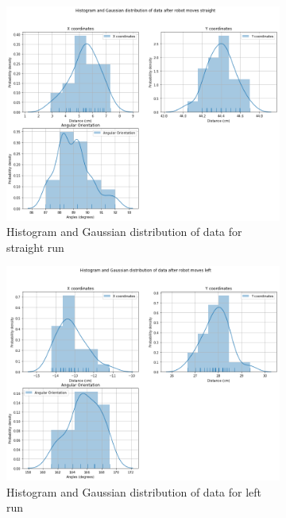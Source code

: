 \documentclass[10pt,a4paper]{article}
\begin{document}
				 \begin{figure}[H]
				 	\begin{subfigure}{\textwidth}
				 		\centering
				 		\includegraphics[width=\linewidth]{img/histplot_st.png}
				 		\caption{Histogram and Gaussian distribution of data for straight run}
				 	\end{subfigure}
				 	\caption{}%
				 \end{figure}
				 \begin{figure}[H]
				 	\begin{subfigure}{\textwidth}
				 		\centering
				 		\includegraphics[width=\linewidth]{img/histplot_lt.png}
				 		\caption{Histogram and Gaussian distribution of data for left run}
				 	\end{subfigure}
				 	\caption{}%
				\end{figure}
\end{document}
